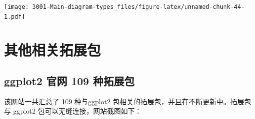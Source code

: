 \documentclass[
]{book}
\begin{document}
\texttt{[image: 3001-Main-diagram-types\_files/figure-latex/unnamed-chunk-44-1.pdf]}

\hypertarget{other-packages}{%
\chapter{其他相关拓展包}\label{other-packages}}

\hypertarget{ggplot2-ux5b98ux7f51-109-ux79cdux62d3ux5c55ux5305}{%
\section{ggplot2 官网 109 种拓展包}\label{ggplot2-ux5b98ux7f51-109-ux79cdux62d3ux5c55ux5305}}

该网站一共汇总了 109 种与ggplot2 包相关的\href{https://exts.ggplot2.tidyverse.org/gallery/}{拓展包}，并且在不断更新中。拓展包与 ggplot2 包可以无缝连接，网站截图如下：
\end{document}

